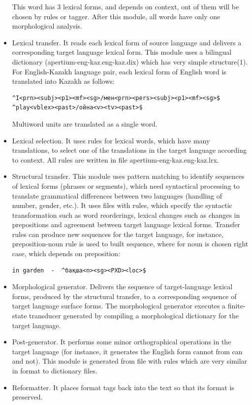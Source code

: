 \documentclass[11pt]{article}
\begin{document}
\begin{itemize}
This word has 3 lexical forms, and depends on context, ont of them will be chosen by rules or tagger. After  this module, all words have only one morphological analysis.
\item	Lexical transfer. It reads each lexical form of source language and delivers a corresponding target language lexical form. This module uses a bilingual dictionary (apertium-eng-kaz.eng-kaz.dix) which has very simple structure(1). For English-Kazakh language pair, each lexical form of English word is translated into Kazakh as follows:
\begin{verbatim}
^I<prn><subj><p1><mf><sg>/мен<prn><pers><subj><p1><mf><sg>$ 
^play<vblex><past>/ойна<v><tv><past>$
\end{verbatim}
 Multiword units are translated as a single word.
\item Lexical selection. It uses rules for lexical words, which have many translations, to select one of the translations in the target language according to context. All rules are written in file apertium-eng-kaz.eng-kaz.lrx.
\item Structural transfer. This module uses pattern matching to identify sequences of lexical forms  (phrases or segments), which need syntactical processing to translate grammatical differences between two languages (handling of number, gender, etc.). It uses  files with rules, which specify  the syntactic transformation such as word reorderings, lexical changes such as changes in prepositions and agreement between target language lexical forms. Transfer rules can produce new sequences for the  target language, for instance, preposition-noun rule is used to built sequence, where for noun is chosen right case, which depends on preposition: 
\begin{verbatim}
in garden  -  ^бақша<n><sg><PXD><loc>$
 \end{verbatim} 
\item	 Morphological generator. Delivers the sequence of target-language lexical forms, produced by the structural transfer, to a corresponding sequence of target language surface forms. The morphological generator executes a finite-state transducer generated by compiling a morphological dictionary for the target language.     
\item Post-generator. It performs some minor orthographical operations in the target language (for instance, it generates the English form cannot from can and not). This module is generated from file with rules which are very   similar in format to dictionary files. 
\item Reformatter. It places format tags back into the text so that its format is preserved.
\end{itemize}
\end{document}
